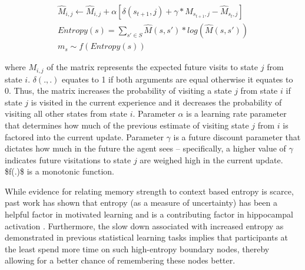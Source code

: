 \begin{equation}
    \begin{aligned}
        \hat{M}_{i,j} \leftarrow \hat{M}_{i,j} + \alpha[\delta(s_{t+1},j) + \gamma*\hat{M}_{s_{t+1},j} - \hat{M}_{s_t,j}] \\ 
        Entropy(s) = \sum_{s' \in S} \hat{M}(s, s') * log(\hat{M}(s, s')) \\ 
        m_s \sim f(Entropy(s))
    \end{aligned}
\end{equation}

where $M_{i,j}$ of the matrix represents the expected future visits to state $j$ from state $i$. $\delta(., .)$ equates to 1 if both arguments are equal otherwise it equates to 0. Thus, the matrix increases the probability of visiting a state $j$ from state $i$ if state $j$ is visited in the current experience and it decreases the probability of visiting all other states from state $i$. Parameter $\alpha$ is a learning rate parameter that determines how much of the previous estimate of visiting state $j$ from $i$ is factored into the current update. Parameter $\gamma$ is a future discount parameter that dictates how much in the future the agent sees -- specifically, a higher value of $\gamma$ indicates future visitations to state $j$ are weighed high in the current update. \ac{$f(.)$ is a monotonic function.}

While evidence for relating memory strength to context based entropy is scarce, past work has shown that entropy (as a measure of uncertainty) has been a helpful factor in motivated learning and is a contributing factor in hippocampal activation \parencite{davis2012striatal}. Furthermore, the slow down associated with increased entropy as demonstrated in previous statistical learning tasks \parencite{lynn2020abstract,lynn2020human,lynn2020humans} implies that participants at the least spend more time on such high-entropy boundary nodes, thereby allowing for a better chance of remembering these nodes better. 

